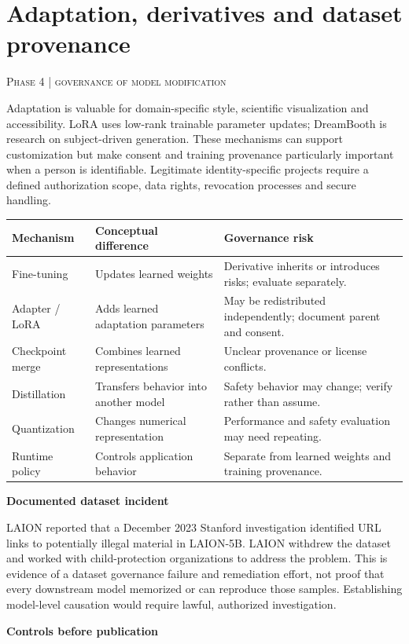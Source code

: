 \documentclass[10pt,a4paper]{article}
\newcommand{\sect}[2]{\Needspace{6\baselineskip}\section{#1}\textcolor{muted}{\small\textsc{#2}}\par\vspace{2mm}}
\newcommand{\sub}[1]{\vspace{1mm}\textbf{#1}\par}
\begin{document}
\sect{Adaptation, derivatives and dataset provenance}{Phase 4 | governance of model modification}

Adaptation is valuable for domain-specific style, scientific visualization and accessibility. LoRA uses low-rank trainable parameter updates; DreamBooth is research on subject-driven generation. These mechanisms can support customization but make consent and training provenance particularly important when a person is identifiable. Legitimate identity-specific projects require a defined authorization scope, data rights, revocation processes and secure handling. \cite{lora,loradiff,dream}


\begin{center}\small\begin{tabularx}{\linewidth}{@{}YYY@{}}\toprule
\textbf{Mechanism} & \textbf{Conceptual difference} & \textbf{Governance risk}\\\midrule
Fine-tuning & Updates learned weights & Derivative inherits or introduces risks; evaluate separately.\\
Adapter / LoRA & Adds learned adaptation parameters & May be redistributed independently; document parent and consent.\\
Checkpoint merge & Combines learned representations & Unclear provenance or license conflicts.\\
Distillation & Transfers behavior into another model & Safety behavior may change; verify rather than assume.\\
Quantization & Changes numerical representation & Performance and safety evaluation may need repeating.\\
Runtime policy & Controls application behavior & Separate from learned weights and training provenance.\\\bottomrule\end{tabularx}\end{center}

\sub{Documented dataset incident}

LAION reported that a December 2023 Stanford investigation identified URL links to potentially illegal material in LAION-5B. LAION withdrew the dataset and worked with child-protection organizations to address the problem. This is evidence of a dataset governance failure and remediation effort, not proof that every downstream model memorized or can reproduce those samples. Establishing model-level causation would require lawful, authorized investigation. \cite{laion}


\sub{Controls before publication}
\end{document}
